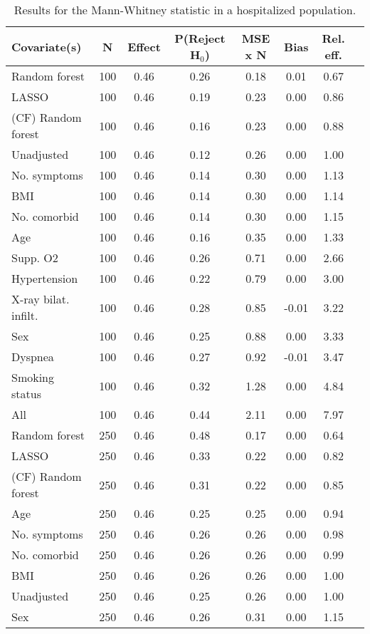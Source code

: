 \documentclass{article}
\begin{document}
{\tabcolsep=6pt  %
\begin{longtable}{lccccccc}
\caption{Results for the Mann-Whitney statistic in a hospitalized population.} \\
Covariate(s) & N & Effect & P(Reject H$_0$) & MSE x N & Bias & Rel. eff.\\ \midrule
Random forest & 100 & 0.46 & 0.26 & 0.18 &  0.01 & 0.67 \\ 
LASSO & 100 & 0.46 & 0.19 & 0.23 &  0.00 & 0.86 \\ 
(CF) Random forest & 100 & 0.46 & 0.16 & 0.23 &  0.00 & 0.88 \\ 
Unadjusted & 100 & 0.46 & 0.12 & 0.26 &  0.00 & 1.00 \\ 
No. symptoms & 100 & 0.46 & 0.14 & 0.30 &  0.00 & 1.13 \\ 
BMI & 100 & 0.46 & 0.14 & 0.30 &  0.00 & 1.14 \\ 
No. comorbid & 100 & 0.46 & 0.14 & 0.30 &  0.00 & 1.15 \\ 
Age & 100 & 0.46 & 0.16 & 0.35 &  0.00 & 1.33 \\ 
Supp. O2 & 100 & 0.46 & 0.26 & 0.71 &  0.00 & 2.66 \\ 
Hypertension & 100 & 0.46 & 0.22 & 0.79 &  0.00 & 3.00 \\ 
X-ray bilat. infilt. & 100 & 0.46 & 0.28 & 0.85 & -0.01 & 3.22 \\ 
Sex & 100 & 0.46 & 0.25 & 0.88 &  0.00 & 3.33 \\ 
Dyspnea & 100 & 0.46 & 0.27 & 0.92 & -0.01 & 3.47 \\ 
Smoking status & 100 & 0.46 & 0.32 & 1.28 &  0.00 & 4.84 \\ 
All & 100 & 0.46 & 0.44 & 2.11 &  0.00 & 7.97 \\ \midrule() 
Random forest & 250 & 0.46 & 0.48 & 0.17 &  0.00 & 0.64 \\ 
LASSO & 250 & 0.46 & 0.33 & 0.22 &  0.00 & 0.82 \\ 
(CF) Random forest & 250 & 0.46 & 0.31 & 0.22 &  0.00 & 0.85 \\ 
Age & 250 & 0.46 & 0.25 & 0.25 &  0.00 & 0.94 \\ 
No. symptoms & 250 & 0.46 & 0.26 & 0.26 &  0.00 & 0.98 \\ 
No. comorbid & 250 & 0.46 & 0.26 & 0.26 &  0.00 & 0.99 \\ 
BMI & 250 & 0.46 & 0.26 & 0.26 &  0.00 & 1.00 \\ 
Unadjusted & 250 & 0.46 & 0.25 & 0.26 &  0.00 & 1.00 \\ 
Sex & 250 & 0.46 & 0.26 & 0.31 &  0.00 & 1.15 \\ 

\end{longtable}}
\end{document}
